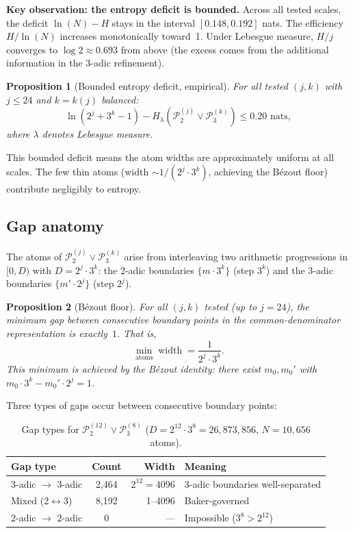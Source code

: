 \documentclass[11pt,a4paper]{article}
\newtheorem{proposition}{Proposition}
\begin{document}
\textbf{Key observation: the entropy deficit is bounded.}
Across all tested scales, the deficit $\ln(N) - H$ stays in the
interval $[0.148, 0.192]$ nats.
The efficiency $H / \ln(N)$ increases monotonically toward~1.
Under Lebesgue measure, $H/j$ converges to $\log 2 \approx 0.693$
from above (the excess comes from the additional information in the
3-adic refinement).

\begin{proposition}[Bounded entropy deficit, empirical]
\label{prop:deficit}
For all tested $(j, k)$ with $j \leq 24$ and $k = k(j)$ balanced:
\[
\ln(2^j + 3^k - 1) - H_\lambda(\mathcal{P}_2^{(j)} \vee \mathcal{P}_3^{(k)})
\leq 0.20 \text{ nats},
\]
where $\lambda$ denotes Lebesgue measure.
\end{proposition}

This bounded deficit means the atom widths are approximately uniform
at all scales.  The few thin atoms (width $\sim 1/(2^j \cdot 3^k)$,
achieving the B\'ezout floor) contribute negligibly to entropy.

\subsection{Gap anatomy}

The atoms of $\mathcal{P}_2^{(j)} \vee \mathcal{P}_3^{(k)}$ arise from
interleaving two arithmetic progressions in $[0, D)$ with $D = 2^j \cdot 3^k$:
the 2-adic boundaries $\{m \cdot 3^k\}$ (step $3^k$) and the 3-adic
boundaries $\{m' \cdot 2^j\}$ (step $2^j$).

\begin{proposition}[B\'ezout floor]
\label{prop:bezout}
For all $(j, k)$ tested (up to $j = 24$), the minimum gap between
consecutive boundary points in the common-denominator representation is
exactly~$1$.
That is,
\[
\min_{\text{atoms}} \operatorname{width} = \frac{1}{2^j \cdot 3^k}.
\]
This minimum is achieved by the B\'ezout identity: there exist
$m_0, m_0'$ with $m_0 \cdot 3^k - m_0' \cdot 2^j = 1$.
\end{proposition}

Three types of gaps occur between consecutive boundary points:

\begin{table}[h]
\centering
\caption{Gap types for $\mathcal{P}_2^{(12)} \vee \mathcal{P}_3^{(8)}$
  ($D = 2^{12} \cdot 3^8 = 26{,}873{,}856$, $N = 10{,}656$ atoms).}
\label{tab:gaps}
\begin{tabular}{lcrl}
\toprule
Gap type & Count & Width & Meaning \\
\midrule
3-adic $\to$ 3-adic & 2,464 & $2^{12} = 4096$ & 3-adic boundaries well-separated \\
Mixed (2$\leftrightarrow$3) & 8,192 & 1--4096 & Baker-governed \\
2-adic $\to$ 2-adic & 0 & --- & Impossible ($3^8 > 2^{12}$) \\
\bottomrule
\end{tabular}
\end{table}
\end{document}
